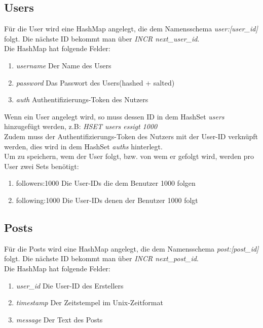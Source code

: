 \documentclass[
    a4paper
]{scrreprt}
\begin{document}
	\subsection*{Users}
		Für die User wird eine HashMap angelegt, die dem Namensschema \textit{user:[user\_id]} folgt. Die nächste ID bekommt man über \textit{INCR next\_user\_id}. \\
		Die HashMap hat folgende Felder:
		\begin{enumerate}
			\item \textit{username} {Der Name des Users}
			\item \textit{password} {Das Passwort des Users(hashed + salted)}
			\item \textit{auth} {Authentifizierungs-Token des Nutzers}			
		\end{enumerate}
		
		Wenn ein User angelegt wird, so muss dessen ID in dem HashSet \textit{users} hinzugefügt werden, z.B: \textit{HSET users essigt 1000}\\
		
		Zudem muss der Authentifizierungs-Token des Nutzers mit der User-ID verknüpft werden, dies wird in dem HashSet \textit{auths} hinterlegt. \\
		
		Um zu speichern, wem der User folgt, bzw. von wem er gefolgt wird, werden pro User zwei Sets benötigt:
		\begin{enumerate}
			\item followers:1000 {Die User-IDs die dem Benutzer 1000 folgen}
			\item following:1000 {Die User-IDs denen der Benutzer 1000 folgt}
		\end{enumerate}

	
	\subsection*{Posts}
		Für die Posts wird eine HashMap angelegt, die dem Namensschema \textit{post:[post\_id]} folgt. Die nächste ID bekommt man über \textit{INCR next\_post\_id}. \\
		Die HashMap hat folgende Felder:
		\begin{enumerate}
			\item \textit{user\_id} {Die User-ID des Erstellers}
			\item \textit{timestamp} {Der Zeitstempel im Unix-Zeitformat}
			\item \textit{message} {Der Text des Posts}
		\end{enumerate}
		
\end{document}
